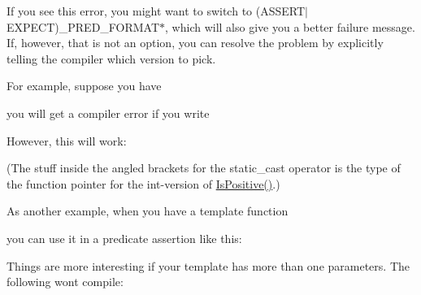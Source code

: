 If you see this error, you might want to switch to {\ttfamily (A\+S\+S\+E\+R\+T$\vert$\+E\+X\+P\+E\+CT)\+\_\+\+P\+R\+E\+D\+\_\+\+F\+O\+R\+M\+A\+T$\ast$}, which will also give you a better failure message. If, however, that is not an option, you can resolve the problem by explicitly telling the compiler which version to pick.

For example, suppose you have


\begin{DoxyCode}{0}
\DoxyCodeLine{\}}
\DoxyCodeLine{}
\DoxyCodeLine{\}}
\end{DoxyCode}


you will get a compiler error if you write


\begin{DoxyCode}{0}
\end{DoxyCode}


However, this will work\+:


\begin{DoxyCode}{0}
\end{DoxyCode}


(The stuff inside the angled brackets for the {\ttfamily static\+\_\+cast} operator is the type of the function pointer for the {\ttfamily int}-\/version of {\ttfamily \mbox{\hyperlink{namespacetesting_1_1gmock__matchers__test_a70e728cf67d0224c3ebb9eb8959cc39d}{Is\+Positive()}}}.)

As another example, when you have a template function


\begin{DoxyCode}{0}
\DoxyCodeLine{\}}
\end{DoxyCode}


you can use it in a predicate assertion like this\+:


\begin{DoxyCode}{0}
\end{DoxyCode}


Things are more interesting if your template has more than one parameters. The following won\textquotesingle{}t compile\+:


